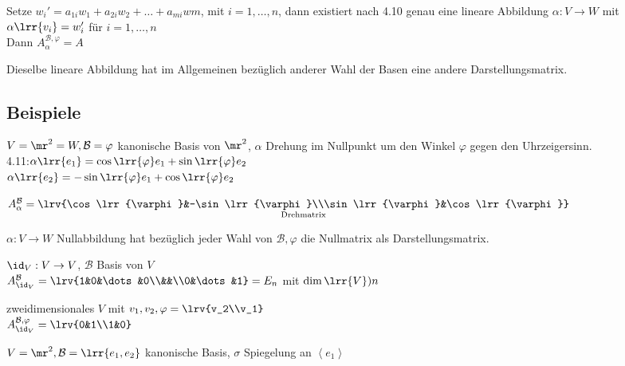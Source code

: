 			Setze $w_i'=a_{1i}w_1+a_{2i}w_2+\dots+a_{mi}w{m}$, mit $i=1,\dots,n$, dann existiert nach 4.10 genau eine lineare Abbildung $\alpha:V\rightarrow W$ mit $\alpha\lrr{v_i}=w_i'$ für $i=1,\dots,n$\\
			Dann $A_{\alpha}^{\mathcal{B}, \varphi}=A$
		\item Dieselbe lineare Abbildung hat im Allgemeinen bezüglich anderer Wahl der Basen eine andere Darstellungsmatrix.
	\subExEnd

\subsection{Beispiele}
		\item $V=\mr^2=W, \mathcal{B}=\varphi$ kanonische Basis von $\mr^2$, $\alpha$ Drehung im Nullpunkt um den Winkel $\varphi$ gegen den Uhrzeigersinn.\\
			4.11:$\alpha\lrr{e_1}=\cos\lrr{\varphi}e_1+\sin\lrr{\varphi}e_2$\\
			$\alpha\lrr{e_2}=-\sin\lrr{\varphi}e_1+\cos\lrr{\varphi}e_2$

			$A_{\alpha}^{\mathcal{B}}=\underset{\mbox{\scriptsize Drehmatrix}}{\lrv{\cos\lrr{\varphi}&-\sin\lrr{\varphi}\\\sin\lrr{\varphi}&\cos\lrr{\varphi}}}$
		\item $\alpha:V\rightarrow W$ Nullabbildung hat bezüglich jeder Wahl von $\mathcal{B},\varphi$ die Nullmatrix als Darstellungsmatrix.
		\item $\id_V:V\rightarrow V$, $\mathcal{B}$ Basis von $V$\\
			$A_{\id_V}^{\mathcal{B}}=\lrv{1&0&\dots&0\\&&\\0&\dots&1}=E_n$ mit $\dim\lrr{V})n$
		\item zweidimensionales $V$ mit $v_1,v_2,\varphi=\lrv{v_2\\v_1}$\\
			$A_{\id_V}^{\mathcal{B},\varphi}=\lrv{0&1\\1&0}$
		\item $V=\mr^2,\mathcal{B}=\lrr{e_1,e_2}$ kanonische Basis, $\sigma$ Spiegelung an $\left\langle e_1\right\rangle$


